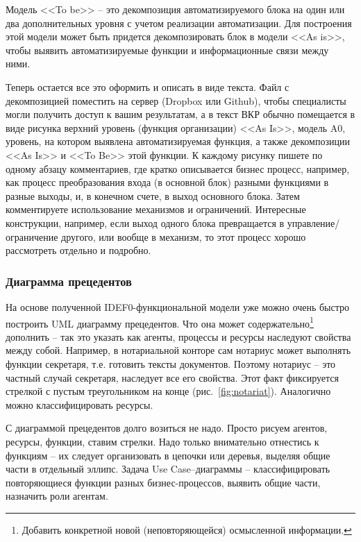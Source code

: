 \documentclass[a4paper,14pt,final]{extreport}
\begin{document}
Модель <<To be>> -- это декомпозиция автоматизируемого блока на один или два дополнительных уровня с учетом реализации автоматизации.  Для построения этой модели может быть придется декомпозировать блок в модели <<As is>>, чтобы выявить автоматизируемые функции и информационные связи между ними.

Теперь остается все это оформить и описать в виде текста.  Файл с декомпозицией поместить на сервер (Dropbox или Github), чтобы специалисты могли получить доступ к вашим результатам, а в текст ВКР обычно помещается в виде рисунка верхний уровень (функция организации) <<As Is>>, модель A0, уровень, на котором выявлена автоматизируемая функция, а также декомпозиции <<As Is>> и <<To Be>> этой функции.  К каждому рисунку пишете по одному абзацу комментариев, где кратко описывается бизнес процесс, например, как процесс преобразования входа (в основной блок) разными функциями в разные выходы, и, в конечном счете, в выход основного блока.  Затем комментируете использование механизмов и ограничений.  Интересные конструкции, например, если выход одного блока превращается в управление/ограничение другого, или вообще в механизм, то этот процесс хорошо рассмотреть отдельно и подробно.

\subsubsection{Диаграмма прецедентов}
\label{sec:umlusecase}

На основе полученной IDEF0-функциональной модели уже можно очень быстро построить UML диаграмму прецедентов.  Что она может содержательно\footnote{Добавить конкретной новой (неповторяющейся) осмысленной информации.} дополнить -- так это указать как агенты, процессы и ресурсы наследуют свойства между собой.  Например, в нотариальной конторе сам нотариус может выполнять функции секретаря, т.е. готовить тексты документов.  Поэтому нотариус -- это частный случай секретаря, наследует все его свойства.  Этот факт фиксируется стрелкой с пустым треугольником на конце (рис.~\ref{fig:notariat}).  Аналогично можно классифицировать ресурсы.

С диаграммой прецедентов долго возиться не надо.  Просто рисуем агентов, ресурсы, функции, ставим стрелки.  Надо только внимательно отнестись к функциям -- их следует организовать в цепочки или деревья, выделяя общие части в отдельный эллипс.  Задача Use Case\;--\;диаграммы -- классифицировать повторяющиеся функции разных бизнес-процессов, выявить общие части, назначить роли агентам.
\end{document}
